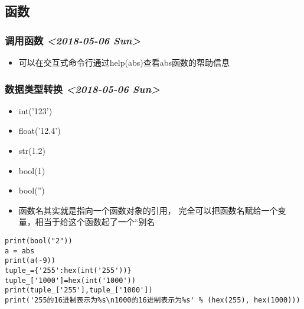 \documentclass[11pt]{article}
\begin{document}
\subsection{函数}
\label{sec:org55b5665}
\subsubsection{调用函数 \textit{<2018-05-06 Sun>}}
\label{sec:orgc0814b7}
\begin{itemize}
\item 可以在交互式命令行通过help(abs)查看abs函数的帮助信息
\end{itemize}
\subsubsection{数据类型转换 \textit{<2018-05-06 Sun>}}
\label{sec:org923b99d}
\begin{itemize}
\item int('123')
\item float('12.4')
\item str(1.2)
\item bool(1)
\item bool('')
\item 函数名其实就是指向一个函数对象的引用，
完全可以把函数名赋给一个变量，相当于给这个函数起了一个“别名
\end{itemize}
\begin{verbatim}
print(bool("2"))
a = abs
print(a(-9))
tuple_={'255':hex(int('255'))}
tuple_['1000']=hex(int('1000'))
print(tuple_['255'],tuple_['1000'])
print('255的16进制表示为%s\n1000的16进制表示为%s' % (hex(255), hex(1000)))
\end{verbatim}
\end{document}
